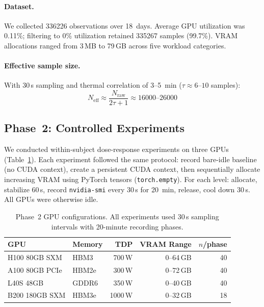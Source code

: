\documentclass[sigconf,nonacm]{acmart}
\begin{document}
\paragraph{Dataset.} We collected \num{336226} observations over 18~days. Average GPU utilization was 0.11\%; filtering to 0\% utilization retained \num{335267} samples (99.7\%). VRAM allocations ranged from 3\,MB to 79\,GB across five workload categories.

\paragraph{Effective sample size.} With 30\,s sampling and thermal correlation of 3--5~min ($\tau \approx 6$--$10$ samples):
\begin{equation}
    N_{\text{eff}} \approx \frac{N_{\text{raw}}}{2\tau + 1} \approx \num{16000}\text{--}\num{26000}
    \label{eq:neff}
\end{equation}


\subsection{Phase~2: Controlled Experiments}

We conducted within-subject dose-response experiments on three GPUs (Table~\ref{tab:gpus}). Each experiment followed the same protocol: record bare-idle baseline (no CUDA context), create a persistent CUDA context, then sequentially allocate increasing VRAM using PyTorch tensors (\texttt{torch.empty}). For each level: allocate, stabilize 60\,s, record \texttt{nvidia-smi} every 30\,s for 20~min, release, cool down 30\,s. All GPUs were otherwise idle.

\begin{table}[t]
\caption{Phase~2 GPU configurations. All experiments used 30\,s sampling intervals with 20-minute recording phases.}
\label{tab:gpus}
\small
\begin{tabular}{llrrr}
\toprule
\textbf{GPU} & \textbf{Memory} & \textbf{TDP} & \textbf{VRAM Range} & $n$/\textbf{phase} \\
\midrule
H100 80GB SXM & HBM3 & 700\,W & 0--64\,GB & 40 \\
A100 80GB PCIe & HBM2e & 300\,W & 0--72\,GB & 40 \\
L40S 48GB & GDDR6 & 350\,W & 0--40\,GB & 40 \\
B200 180GB SXM & HBM3e & 1000\,W & 0--32\,GB & 18 \\
\bottomrule
\end{tabular}
\end{table}
\end{document}
